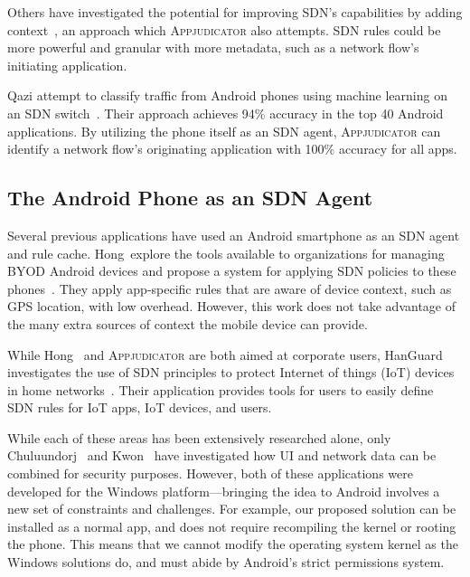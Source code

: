 Others have investigated the potential for improving SDN's capabilities by
adding context~\cite{yang2015}, an approach which \textsc{Appjudicator} also
attempts. SDN rules could be more powerful and granular with more metadata, such
as a network flow's initiating application.

Qazi \etal attempt to classify traffic from Android phones using machine
learning on an SDN switch~\cite{qazi2013}. Their approach achieves 94\% accuracy
in the top 40 Android applications. By utilizing the phone itself as an SDN
agent, \textsc{Appjudicator} can identify a network flow's originating
application with 100\% accuracy for all apps.

\subsection{The Android Phone as an SDN Agent}
\label{sec:the-android-phone-as-an-sdn-agent}

Several previous applications have used an Android smartphone as an SDN agent
and rule cache. Hong~\etal explore the tools available to organizations for
managing BYOD Android devices and propose a system for applying SDN policies to
these phones~\cite{hong2016}. They apply app-specific rules that are aware of
device context, such as GPS location, with low overhead. However, this work does
not take advantage of the many extra sources of context the mobile device can
provide.

While Hong~\etal \cite{hong2016} and \textsc{Appjudicator} are both aimed at
corporate users, HanGuard investigates the use of SDN principles to protect
Internet of things (IoT) devices in home networks~\cite{demetriou2017}. Their
application provides tools for users to easily define SDN rules for IoT apps,
IoT devices, and users.

While each of these areas has been extensively researched alone, only
Chuluundorj~\cite{chuluundorj2019} and Kwon~\etal \cite{kwon2011} have
investigated how UI and network data can be combined for security purposes.
However, both of these applications were developed for the Windows
platform---bringing the idea to Android involves a new set of constraints and
challenges. For example, our proposed solution can be installed as a normal app,
and does not require recompiling the kernel or rooting the phone. This means
that we cannot modify the operating system kernel as the Windows solutions do,
and must abide by Android's strict permissions system.

\newpage

